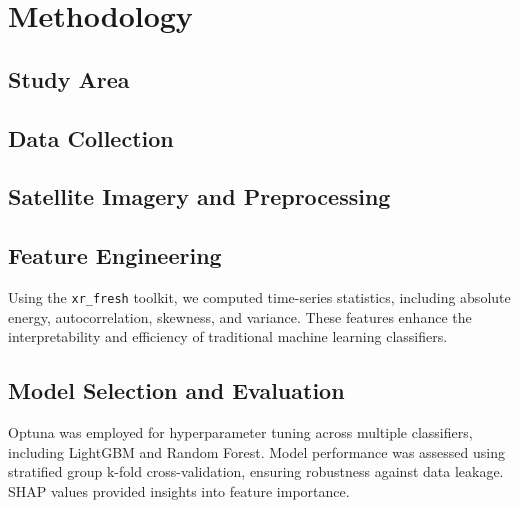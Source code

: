 \documentclass[journal]{IEEEtran}
\begin{document}
 
 


\section{Methodology}
\subsection{Study Area}
 
\subsection{Data Collection}
 

\subsection{Satellite Imagery and Preprocessing}
 
\subsection{Feature Engineering}
Using the \texttt{xr\_fresh} toolkit, we computed time-series statistics, including absolute energy, autocorrelation, skewness, and variance. These features enhance the interpretability and efficiency of traditional machine learning classifiers.

\subsection{Model Selection and Evaluation}
Optuna was employed for hyperparameter tuning across multiple classifiers, including LightGBM and Random Forest. Model performance was assessed using stratified group k-fold cross-validation, ensuring robustness against data leakage. SHAP values provided insights into feature importance.
\end{document}
